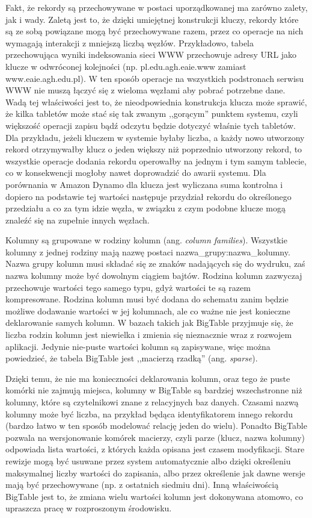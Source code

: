 Fakt, że rekordy są przechowywane w postaci uporządkowanej ma zarówno zalety, jak i wady.
Zaletą jest to, że dzięki umiejętnej konstrukcji kluczy, rekordy które są ze sobą powiązane mogą być przechowywane razem, przez co operacje na nich wymagają interakcji z mniejszą liczbą węzłów.
Przykładowo, tabela przechowująca wyniki indeksowania sieci WWW przechowuje adresy URL jako klucze w odwróconej kolejności (np. pl.edu.agh.eaie.www zamiast www.eaie.agh.edu.pl).
W ten sposób operacje na wszystkich podstronach serwisu WWW nie muszą łączyć się z wieloma węzłami aby pobrać potrzebne dane.
Wadą tej właściwości jest to, że nieodpowiednia konstrukcja klucza może sprawić, że kilka tabletów może stać się tak zwanym ,,gorącym'' punktem systemu, czyli większość operacji zapisu bądź odczytu będzie dotyczyć właśnie tych tabletów.
Dla przykładu, jeżeli kluczem w systemie byłaby liczba, a każdy nowo utworzony rekord otrzymywałby klucz o jeden większy niż poprzednio utworzony rekord, to wszystkie operacje dodania rekordu operowałby na jednym i tym samym tablecie, co w konsekwencji mogłoby nawet doprowadzić do awarii systemu.
Dla porównania w Amazon Dynamo dla klucza jest wyliczana suma kontrolna i dopiero na podstawie tej wartości następuje przydział rekordu do określonego przedziału a co za tym idzie węzła, w związku z czym podobne klucze mogą znaleźć się na zupełnie innych węzłach.

Kolumny są grupowane w rodziny kolumn (ang. \emph{column families}).
Wszystkie kolumny z jednej rodziny mają nazwę postaci nazwa\_grupy:nazwa\_kolumny.
Nazwa grupy kolumn musi składać się ze znaków nadających się do wydruku, zaś nazwa kolumny może być dowolnym ciągiem bajtów.
Rodzina kolumn zazwyczaj przechowuje wartości tego samego typu, gdyż wartości te są razem kompresowane.
Rodzina kolumn musi być dodana do schematu zanim będzie możliwe dodawanie wartości w jej kolumnach, ale co ważne nie jest konieczne deklarowanie samych kolumn.
W bazach takich jak BigTable przyjmuje się, że liczba rodzin kolumn jest niewielka i zmienia się nieznacznie wraz z rozwojem aplikacji.
Jedynie nie-puste wartości kolumn są zapisywane, więc można powiedzieć, że tabela BigTable jest ,,macierzą rzadką'' (ang. \emph{sparse}).

Dzięki temu, że nie ma konieczności deklarowania kolumn, oraz tego że puste komórki nie zajmują miejsca, kolumny w BigTable są bardziej wszechstronne niż kolumny, które są czytelnikowi znane z relacyjnych baz danych.
Czasami nazwą kolumny może być liczba, na przykład będąca identyfikatorem innego rekordu (bardzo łatwo w ten sposób modelować relację jeden do wielu).
Ponadto BigTable pozwala na wersjonowanie komórek macierzy, czyli parze (klucz, nazwa kolumny) odpowiada lista wartości, z których każda opisana jest czasem modyfikacji.
Stare rewizje mogą być usuwane przez system automatycznie albo dzięki określeniu maksymalnej liczby wartości do zapisania, albo przez określenie jak dawne wersje mają być przechowywane (np. z ostatnich siedmiu dni).
Inną właściwością BigTable jest to, że zmiana wielu wartości kolumn jest dokonywana atomowo, co upraszcza pracę w rozproszonym środowisku.

